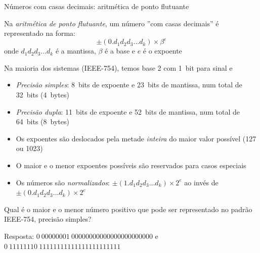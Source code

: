 \begin{frame}{Números com casas decimais: aritmética de ponto flutuante}
    \begin{tcolorbox}[colback=red!10]
        Na \textit{aritmética de ponto flutuante}, um número ''com casas decimais'' é representado
        na forma:
        \[
            \pm (0 . d_1 d_2 d_3 \ldots d_k) \times \beta^e
        \]
        onde \(d_ 1 d_2 d_3 \ldots d_k\) é a mantissa, \(\beta\) é a base e \(e\) é o expoente
    \end{tcolorbox}
    \pause
    Na maioria dos sistemas (IEEE-754), temos base 2 com \SI{1}{bit} para sinal e
    \begin{itemize}
        \item \textit{Precisão simples}: \SI{8}{bits} de expoente e \SI{23}{bits} de mantissa, num total de 
            \SI{32}{bits} (\SI{4}{bytes})
        \item \textit{Precisão dupla}: \SI{11}{bits} de expoente e \SI{52}{bits} de mantissa, num total de 
            \SI{64}{bits} (\SI{8}{bytes})
        \item Os expoentes são deslocados pela metade \textit{inteira} do maior
            valor possível (127 ou 1023)
        \item O maior e o menor expoentes possíveis são reservados para \alert{casos especiais}
        \item Os números são \textit{normalizados}: \( \pm (1 . d_1 d_2 d_3 \ldots d_k) \times 2^e\) 
            ao invés de \( \pm (0 . d_1 d_2 d_3 \ldots d_k) \times 2^e\)
    \end{itemize}
    \pause
    \begin{tcolorbox}[colback=blue!10]
        Qual é o maior e o menor número positivo que pode ser representado no padrão IEEE-754, precisão simples?

        \tiny{Resposta: \(0~00000001~0000 0000 0000 0000 0000 000\) e \(0~11111110~1111 1111 1111 11111 111 111\)}
    \end{tcolorbox}
\end{frame}


